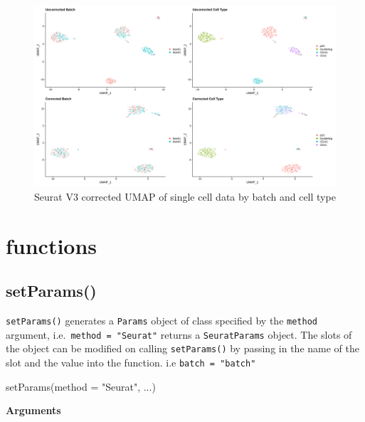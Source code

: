 \documentclass[
]{book}
\newenvironment{Shaded}{\begin{snugshade}}{\end{snugshade}}
\newcommand{\AttributeTok}[1]{\textcolor[rgb]{0.77,0.63,0.00}{#1}}
\newcommand{\FunctionTok}[1]{\textcolor[rgb]{0.00,0.00,0.00}{#1}}
\newcommand{\NormalTok}[1]{#1}
\newcommand{\StringTok}[1]{\textcolor[rgb]{0.31,0.60,0.02}{#1}}
\begin{document}
\begin{figure}

{\centering \includegraphics[width=33.33in,height=0.8\textheight]{_book/ensemblemerge_files/images/seurat_integrate} 

}

\caption{Seurat V3 corrected UMAP of single cell data by batch and cell type}\label{fig:unnamed-chunk-13}
\end{figure}

\hypertarget{functions}{%
\chapter{functions}\label{functions}}

\hypertarget{setparams}{%
\section{setParams()}\label{setparams}}

\texttt{setParams()} generates a \texttt{Params} object of class specified by the \texttt{method} argument, i.e.~\texttt{method\ =\ "Seurat"} returns a \texttt{SeuratParams} object. The slots of the object can be modified on calling \texttt{setParams()} by passing in the name of the slot and the value into the function. i.e \texttt{batch\ =\ "batch"}

\begin{Shaded}
\begin{Highlighting}[]
\FunctionTok{setParams}\NormalTok{(}\AttributeTok{method =} \StringTok{"Seurat"}\NormalTok{, ...)}
\end{Highlighting}
\end{Shaded}

\textbf{Arguments}
\end{document}
